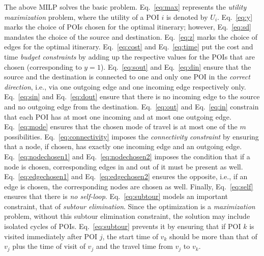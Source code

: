The above MILP solves the basic \trip problem.  Eq.~\eqref{eq:max}
represents the \emph{utility maximization} problem, where the
utility of a POI $i$ is denoted by $U_i$.  Eq.~\eqref{eq:y} marks
the choice of POIs chosen for the optimal itinerary; however,
Eq.~\eqref{eq:sd} mandates the choice of the source and destination.
Eq.~\eqref{eq:z} marks the choice of edges for the optimal
itinerary.  Eq.~\eqref{eq:cost} and Eq.~\eqref{eq:time} put the
cost and time \emph{budget constraints} by adding up the
respective values for the POIs that are chosen (corresponding to
$y = 1$).  Eq.~\eqref{eq:sout} and Eq.~\eqref{eq:din} ensure that
the source and the destination is connected to one and only one
POI in the \emph{correct direction}, i.e., via one outgoing edge
and one incoming edge respectively only.  Eq.~\eqref{eq:sin} and
Eq.~\eqref{eq:dout} ensure that there is no incoming edge to the
source and no outgoing edge from the destination.
Eq.~\eqref{eq:out} and Eq.~\eqref{eq:in} constrain that each POI
has at most one incoming and at most one outgoing edge.
Eq.~\eqref{eq:mode} ensures that the chosen mode of travel is at
most one of the $m$ possibilities.  Eq.~\eqref{eq:connectivity}
imposes the \emph{connectivity constraint} by ensuring that a
node, if chosen, has exactly one incoming edge and an outgoing
edge.  Eq.~\eqref{eq:nodechosen1} and Eq.~\eqref{eq:nodechosen2}
imposes the condition that if a node is chosen, corresponding
edges in and out of it must be present as well.
Eq.~\eqref{eq:edgechosen1} and Eq.~\eqref{eq:edgechosen2} ensures
the opposite, i.e., if an edge is chosen, the corresponding nodes
are chosen as well.  Finally, Eq.~\eqref{eq:self} ensures that
there is \emph{no self-loop}.
Eq.~\eqref{eq:subtour} models an important constraint, that of \emph{subtour
elimination}.
Since the optimization is a \emph{maximization} problem, without this subtour
elimination constraint, the solution may include isolated cycles of POIs.
Eq.~\eqref{eq:subtour} prevents it by ensuring that if POI $k$ is visited
immediately after POI $j$, the start time of $v_k$ should be more than that of
$v_j$ plus the time of visit of $v_j$ and the travel time from $v_j$ to $v_k$.


